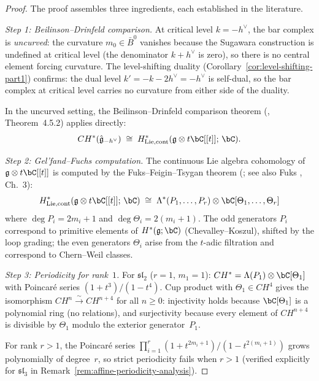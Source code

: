 \begin{proof}
The proof assembles three ingredients, each established in the literature.

\emph{Step 1: Beilinson--Drinfeld comparison.}
At critical level $k = -h^\vee$, the bar complex is \emph{uncurved}:
the curvature $m_0 \in \bar{B}^0$ vanishes because the Sugawara construction
is undefined at critical level (the denominator $k + h^\vee$ is zero), so
there is no central element forcing curvature.  The level-shifting duality
(Corollary~\ref{cor:level-shifting-part1}) confirms: the dual level
$k' = -k - 2h^\vee = -h^\vee$ is self-dual, so the bar complex at
critical level carries no curvature from either side of the duality.

In the uncurved setting, the Beilinson--Drinfeld comparison theorem
(\cite{BD04}, Theorem~4.5.2) applies directly:
\[
CH^*(\hat{\mathfrak{g}}_{-h^\vee}) \;\cong\;
H^*_{\mathrm{Lie,cont}}(\mathfrak{g} \otimes t\bC[[t]];\, \bC).
\]

\emph{Step 2: Gel'fand--Fuchs computation.}
The continuous Lie algebra cohomology of $\mathfrak{g} \otimes t\bC[[t]]$
is computed by the Fuks--Feigin--Tsygan theorem (\cite{FT87}; see also
Fuks \cite{Fuks86}, Ch.~3):
\[
H^*_{\mathrm{Lie,cont}}(\mathfrak{g} \otimes t\bC[[t]];\, \bC) \;\cong\;
\Lambda^*(P_1, \ldots, P_r) \otimes \bC[\Theta_1, \ldots, \Theta_r]
\]
where $\deg P_i = 2m_i + 1$ and $\deg \Theta_i = 2(m_i + 1)$.
The odd generators $P_i$ correspond to primitive elements of
$H^*(\mathfrak{g}; \bC)$ (Chevalley--Koszul), shifted by the loop grading;
the even generators $\Theta_i$ arise from the $t$-adic filtration and
correspond to Chern--Weil classes.

\emph{Step 3: Periodicity for rank~$1$.}
For $\mathfrak{sl}_2$ ($r = 1$, $m_1 = 1$): $CH^* = \Lambda(P_1) \otimes \bC[\Theta_1]$
with Poincar\'e series $(1 + t^3)/(1 - t^4)$.  Cup product with
$\Theta_1 \in CH^4$ gives the isomorphism $CH^n \xrightarrow{\sim} CH^{n+4}$
for all $n \geq 0$: injectivity holds because $\bC[\Theta_1]$ is a
polynomial ring (no relations), and surjectivity because every element of
$CH^{n+4}$ is divisible by $\Theta_1$ modulo the exterior generator~$P_1$.

For rank $r > 1$, the Poincar\'e series
$\prod_{i=1}^r (1 + t^{2m_i+1})/(1-t^{2(m_i+1)})$ grows
polynomially of degree~$r$, so strict periodicity fails when
$r > 1$ (verified explicitly for $\mathfrak{sl}_3$ in
Remark~\ref{rem:affine-periodicity-analysis}).
\end{proof}


